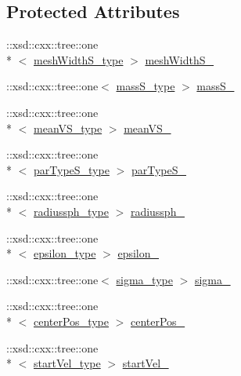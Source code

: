 \subsection*{Protected Attributes}
\begin{DoxyCompactItemize}
\item 
\-::xsd\-::cxx\-::tree\-::one\\*
$<$ \hyperlink{classsphere__t_a82740a9c5aa0437d973ee3e3caad09ea}{mesh\-Width\-S\-\_\-type} $>$ \hyperlink{classsphere__t_a66cbf0de688f330019fca6841df8ff8d}{mesh\-Width\-S\-\_\-}
\item 
\-::xsd\-::cxx\-::tree\-::one$<$ \hyperlink{classsphere__t_a317ddc20b1a4fa225c55721bf12c67b2}{mass\-S\-\_\-type} $>$ \hyperlink{classsphere__t_a155c503f91068e98cac6e50e162fd8e8}{mass\-S\-\_\-}
\item 
\-::xsd\-::cxx\-::tree\-::one\\*
$<$ \hyperlink{classsphere__t_a351152e9b83bac409a627037b99a209b}{mean\-V\-S\-\_\-type} $>$ \hyperlink{classsphere__t_ae69c65c02185ee644621ec5f19050092}{mean\-V\-S\-\_\-}
\item 
\-::xsd\-::cxx\-::tree\-::one\\*
$<$ \hyperlink{classsphere__t_a750fe86f76f8c344ccb25e7dc73c2655}{par\-Type\-S\-\_\-type} $>$ \hyperlink{classsphere__t_aad0691c4e88842ee6d7cbc9bdb747653}{par\-Type\-S\-\_\-}
\item 
\-::xsd\-::cxx\-::tree\-::one\\*
$<$ \hyperlink{classsphere__t_a81d467c00ec72dc7b9907b521744696d}{radiussph\-\_\-type} $>$ \hyperlink{classsphere__t_a69b68e91265646581453df0608c78eb3}{radiussph\-\_\-}
\item 
\-::xsd\-::cxx\-::tree\-::one\\*
$<$ \hyperlink{classsphere__t_a9e61f3d5ab269b28a198f4b47519ac3f}{epsilon\-\_\-type} $>$ \hyperlink{classsphere__t_afe66a61532491a5d947d917b89c94a44}{epsilon\-\_\-}
\item 
\-::xsd\-::cxx\-::tree\-::one$<$ \hyperlink{classsphere__t_a20806454a1e5e7f7fb50b22a49aef704}{sigma\-\_\-type} $>$ \hyperlink{classsphere__t_ab29451e11196d4689c16efd239a3b65d}{sigma\-\_\-}
\item 
\-::xsd\-::cxx\-::tree\-::one\\*
$<$ \hyperlink{classsphere__t_a2786a8606da5d1dfbb50a237d6834daf}{center\-Pos\-\_\-type} $>$ \hyperlink{classsphere__t_a0737ba2a8523d266f64b084f3efa9a48}{center\-Pos\-\_\-}
\item 
\-::xsd\-::cxx\-::tree\-::one\\*
$<$ \hyperlink{classsphere__t_a0235d82d12e4f91c5656e8ae64da4ca6}{start\-Vel\-\_\-type} $>$ \hyperlink{classsphere__t_a891193e6c93432b62517c06b5c1f7872}{start\-Vel\-\_\-}
\end{DoxyCompactItemize}



